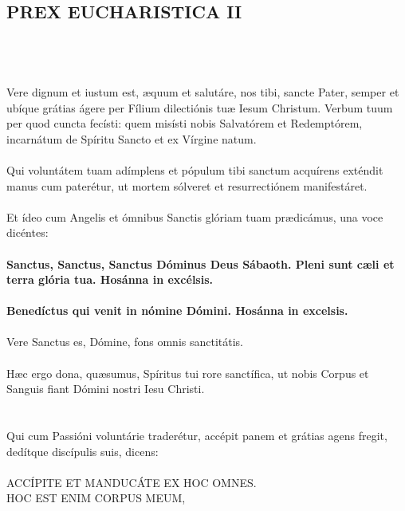 \documentclass[12pt, a4paper]{article}
\begin{document}
	\subsection*{PREX EUCHARISTICA II}
	
	\\
	\\
	\\
	Vere dignum et iustum est, æquum
	et salutáre, nos tibi, sancte Pater,
	semper et ubíque grátias ágere per
	Fílium dilectiónis tuæ Iesum
	Christum. Verbum tuum per quod
	cuncta fecísti: quem misísti nobis
	Salvatórem et Redemptórem,
	incarnátum de Spíritu Sancto et ex
	Vírgine natum.
	\\\\
	Qui voluntátem tuam adímplens
	et pópulum tibi sanctum acquírens
	exténdit manus cum paterétur,
	ut mortem sólveret et
	resurrectiónem manifestáret.
	\\\\
	Et ídeo cum Angelis et ómnibus
	Sanctis glóriam tuam prædicámus,
	una voce dicéntes:
	\\\\
	\textbf{Sanctus, Sanctus, Sanctus Dóminus
	Deus Sábaoth. Pleni sunt cæli et
	terra glória tua. Hosánna in
	excélsis.}
	\\\\
	\textbf{Benedíctus qui venit in nómine
	Dómini. Hosánna in excelsis.}
	\\\\
	Vere Sanctus es, Dómine, fons
	omnis sanctitátis.
	\\\\
	Hæc ergo dona, quæsumus, Spíritus
	tui rore sanctífica, ut nobis Corpus
	et Sanguis fiant Dómini nostri
	Iesu Christi.
	\\\\
	\\
	Qui cum Passióni voluntárie
	traderétur, accépit panem et grátias
	agens fregit, dedítque discípulis
	suis, dicens:
	\\\\
	ACCÍPITE ET MANDUCÁTE EX HOC
	OMNES.
	\\
	HOC EST ENIM CORPUS MEUM,
	\\
\end{document}
